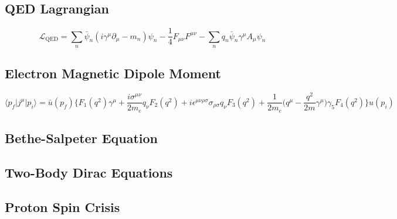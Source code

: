\documentclass[9pt]{report}
\begin{document}
\subsection{QED Lagrangian}
\begin{equation}
\mathcal{L}_{\mathrm{QED}}=\sum_{n}\bar{\psi}_{n}(i\gamma^{\mu}\partial_{\mu}-m_{n})\psi_{n}-\frac{1}{4}F_{\mu\nu}F^{\mu\nu}-\sum_{n}q_{n}\bar{\psi}_{n}\gamma^{\mu}A_{\mu}\psi_{n}
\end{equation}

\subsection{Electron Magnetic Dipole Moment}
\begin{equation}
\langle p_{f}|j^{\mu}|p_{i}\rangle = \bar{u}(p_{f})\bigg\{ F_{1}(q^2)\gamma^{\mu} +\frac{i\sigma^{\mu\nu}}{2m_{e}}q_{\nu}F_{2}(q^2)+i\epsilon^{\mu\nu\rho\sigma}\sigma_{\rho\sigma}q_{\nu}F_{3}(q^2) +\frac{1}{2m_e}\bigg(q^{\mu}-\frac{q^2}{2m}\gamma^{\mu}\bigg)\gamma_{5}F_{4}(q^2)\bigg\}u(p_i)
\end{equation}

\subsection{Bethe-Salpeter Equation}

\subsection{Two-Body Dirac Equations}

\subsection{Proton Spin Crisis}
\end{document}
